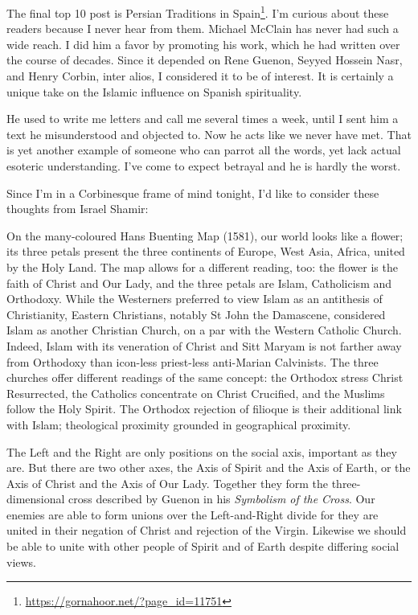 The final top 10 post is Persian Traditions in Spain\footnote{\url{https://gornahoor.net/?page\_id=11751}}. I'm curious about these readers because I never hear from them. Michael McClain has never had such a wide reach. I did him a favor by promoting his work, which he had written over the course of decades. Since it depended on Rene Guenon, Seyyed Hossein Nasr, and Henry Corbin, inter alios, I considered it to be of interest. It is certainly a unique take on the Islamic influence on Spanish spirituality.

He used to write me letters and call me several times a week, until I sent him a text he misunderstood and objected to. Now he acts like we never have met. That is yet another example of someone who can parrot all the words, yet lack actual esoteric understanding. I've come to expect betrayal and he is hardly the worst.

Since I'm in a Corbinesque frame of mind tonight, I'd like to consider these thoughts from Israel Shamir:




\begin{quotationx}
On the many-coloured Hans Buenting Map (1581), our world looks like a flower; its three petals present the three continents of Europe, West Asia, Africa, united by the Holy Land. The map allows for a different reading, too: the flower is the faith of Christ and Our Lady, and the three petals are Islam, Catholicism and Orthodoxy. While the Westerners preferred to view Islam as an antithesis of Christianity, Eastern Christians, notably St John the Damascene, considered Islam as another Christian Church, on a par with the Western Catholic Church. Indeed, Islam with its veneration of Christ and Sitt Maryam is not farther away from Orthodoxy than icon-less priest-less anti-Marian Calvinists. The three churches offer different readings of the same concept: the Orthodox stress Christ Resurrected, the Catholics concentrate on Christ Crucified, and the Muslims follow the Holy Spirit. The Orthodox rejection of filioque is their additional link with Islam; theological proximity grounded in geographical proximity.

The Left and the Right are only positions on the social axis, important as they are. But there are two other axes, the Axis of Spirit and the Axis of Earth, or the Axis of Christ and the Axis of Our Lady. Together they form the three-dimensional cross described by Guenon in his \emph{Symbolism of the Cross}. Our enemies are able to form unions over the Left-and-Right divide for they are united in their negation of Christ and rejection of the Virgin. Likewise we should be able to unite with other people of Spirit and of Earth despite differing social views.
\end{quotationx}


